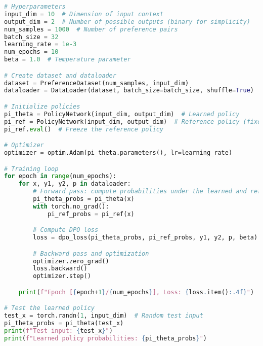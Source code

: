 \begin{lstlisting}[language=Python]
# Hyperparameters
input_dim = 10  # Dimension of input context
output_dim = 2  # Number of possible outputs (binary for simplicity)
num_samples = 1000  # Number of preference pairs
batch_size = 32
learning_rate = 1e-3
num_epochs = 10
beta = 1.0  # Temperature parameter

# Create dataset and dataloader
dataset = PreferenceDataset(num_samples, input_dim)
dataloader = DataLoader(dataset, batch_size=batch_size, shuffle=True)

# Initialize policies
pi_theta = PolicyNetwork(input_dim, output_dim)  # Learned policy
pi_ref = PolicyNetwork(input_dim, output_dim)  # Reference policy (fixed)
pi_ref.eval()  # Freeze the reference policy

# Optimizer
optimizer = optim.Adam(pi_theta.parameters(), lr=learning_rate)

# Training loop
for epoch in range(num_epochs):
    for x, y1, y2, p in dataloader:
        # Forward pass: compute probabilities under the learned and reference policies
        pi_theta_probs = pi_theta(x)
        with torch.no_grad():
            pi_ref_probs = pi_ref(x)

        # Compute DPO loss
        loss = dpo_loss(pi_theta_probs, pi_ref_probs, y1, y2, p, beta)

        # Backward pass and optimization
        optimizer.zero_grad()
        loss.backward()
        optimizer.step()

    print(f"Epoch [{epoch+1}/{num_epochs}], Loss: {loss.item():.4f}")

# Test the learned policy
test_x = torch.randn(1, input_dim)  # Random test input
pi_theta_probs = pi_theta(test_x)
print(f"Test input: {test_x}")
print(f"Learned policy probabilities: {pi_theta_probs}")
\end{lstlisting}

